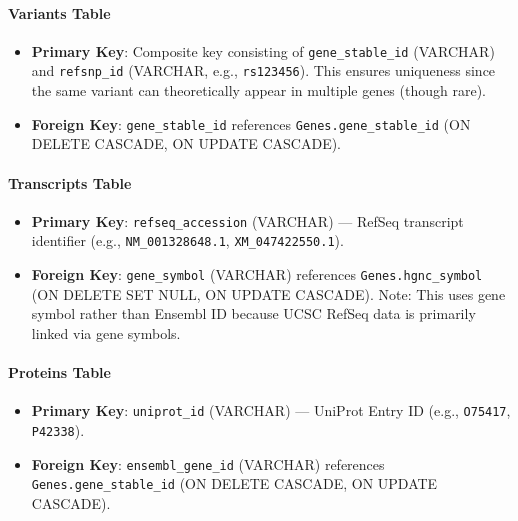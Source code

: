 \documentclass[11pt]{article}
\begin{document}
\paragraph{Variants Table}
\begin{itemize}
	\item \textbf{Primary Key}: Composite key consisting of \texttt{gene\_stable\_id} (VARCHAR) and \texttt{refsnp\_id} (VARCHAR, e.g., \texttt{rs123456}). This ensures uniqueness since the same variant can theoretically appear in multiple genes (though rare).
	\item \textbf{Foreign Key}: \texttt{gene\_stable\_id} references \texttt{Genes.gene\_stable\_id} (ON DELETE CASCADE, ON UPDATE CASCADE).
\end{itemize}

\paragraph{Transcripts Table}
\begin{itemize}
	\item \textbf{Primary Key}: \texttt{refseq\_accession} (VARCHAR) — RefSeq transcript identifier (e.g., \texttt{NM\_001328648.1}, \texttt{XM\_047422550.1}).
	\item \textbf{Foreign Key}: \texttt{gene\_symbol} (VARCHAR) references \texttt{Genes.hgnc\_symbol} (ON DELETE SET NULL, ON UPDATE CASCADE). Note: This uses gene symbol rather than Ensembl ID because UCSC RefSeq data is primarily linked via gene symbols.
\end{itemize}

\paragraph{Proteins Table}
\begin{itemize}
	\item \textbf{Primary Key}: \texttt{uniprot\_id} (VARCHAR) — UniProt Entry ID (e.g., \texttt{O75417}, \texttt{P42338}).
	\item \textbf{Foreign Key}: \texttt{ensembl\_gene\_id} (VARCHAR) references \texttt{Genes.gene\_stable\_id} (ON DELETE CASCADE, ON UPDATE CASCADE).
\end{itemize}
\end{document}
